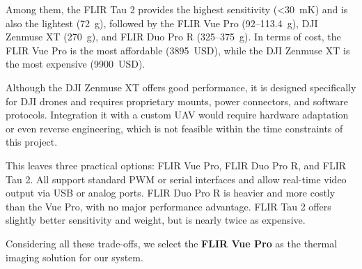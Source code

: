 Among them, the FLIR Tau 2 provides the highest sensitivity (<30~mK) and is also the lightest (72~g), followed by the FLIR Vue Pro (92–113.4~g), DJI Zenmuse XT (270~g), and FLIR Duo Pro R (325–375~g). In terms of cost, the FLIR Vue Pro is the most affordable (3895~USD), while the DJI Zenmuse XT is the most expensive (9900~USD).

Although the DJI Zenmuse XT offers good performance, it is designed specifically for DJI drones and requires proprietary mounts, power connectors, and software protocols. Integration it with a custom UAV would require hardware adaptation or even reverse engineering, which is not feasible within the time constraints of this project.

This leaves three practical options: FLIR Vue Pro, FLIR Duo Pro R, and FLIR Tau 2. All support standard PWM or serial interfaces and allow real-time video output via USB or analog ports. FLIR Duo Pro R is heavier and more costly than the Vue Pro, with no major performance advantage. FLIR Tau 2 offers slightly better sensitivity and weight, but is nearly twice as expensive.

Considering all these trade-offs, we select the \textbf{FLIR Vue Pro} as the thermal imaging solution for our system.


\renewcommand{\arraystretch}{0.9}
\setlength{\tabcolsep}{5pt}


